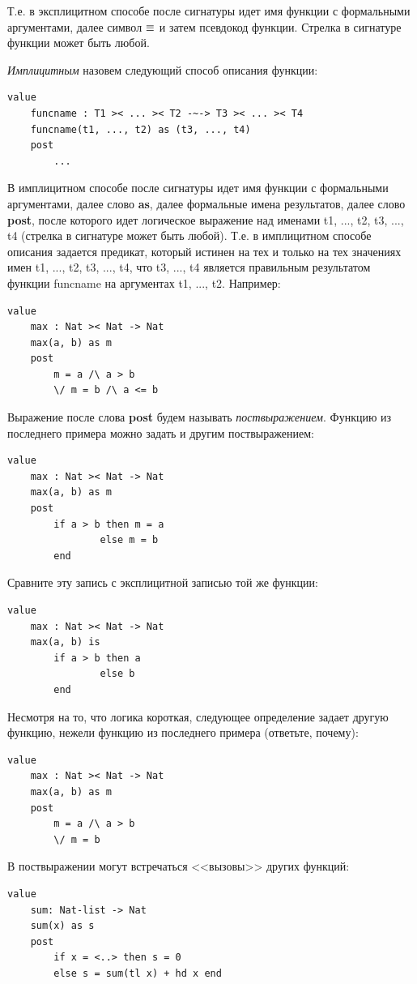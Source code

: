 \documentclass[14pt, twoside]{extreport}
\begin{document}
Т.е. в эксплицитном способе после сигнатуры идет имя функции с формальными аргументами, далее символ $\mathop{\equiv}$ и затем псевдокод функции. Стрелка в сигнатуре функции может быть любой.

\emph{Имплицитным} назовем следующий способ описания функции:
\begin{lstlisting}
value
	funcname : T1 >< ... >< T2 -~-> T3 >< ... >< T4
	funcname(t1, ..., t2) as (t3, ..., t4)
	post
		... 
\end{lstlisting}

В имплицитном способе после сигнатуры идет имя функции с формальными аргументами, далее слово \textbf{as}, далее формальные имена результатов, далее слово \textbf{post}, после которого идет логическое выражение над именами t1, ..., t2, t3, ..., t4 (стрелка в сигнатуре может быть любой). Т.е. в имплицитном способе описания задается предикат, который истинен на тех и только на тех значениях имен t1, ..., t2, t3, ..., t4, что t3, ..., t4 является правильным результатом функции funcname на аргументах t1, ..., t2. Например:
\begin{lstlisting}
value
	max : Nat >< Nat -> Nat
	max(a, b) as m
	post
		m = a /\ a > b
		\/ m = b /\ a <= b
\end{lstlisting}

Выражение после слова \textbf{post} будем называть \emph{поствыражением}. Функцию из последнего примера можно задать и другим поствыражением:
\begin{lstlisting}
value
	max : Nat >< Nat -> Nat
	max(a, b) as m
	post
		if a > b then m = a 
				else m = b
		end
\end{lstlisting}

Сравните эту запись с эксплицитной записью той же функции:
\begin{lstlisting}
value
	max : Nat >< Nat -> Nat
	max(a, b) is
		if a > b then a 
				else b
		end
\end{lstlisting}

Несмотря на то, что логика короткая, следующее определение задает другую функцию, нежели функцию из последнего примера (ответьте, почему):
\begin{lstlisting}
value
	max : Nat >< Nat -> Nat
	max(a, b) as m
	post
		m = a /\ a > b
		\/ m = b
\end{lstlisting}

В поствыражении могут встречаться <<вызовы>> других функций:
\begin{lstlisting}
value
	sum: Nat-list -> Nat
	sum(x) as s
	post
		if x = <..> then s = 0
		else s = sum(tl x) + hd x end
\end{lstlisting}
\end{document}
